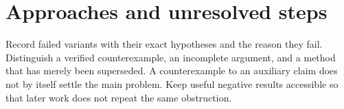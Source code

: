 \section{Approaches and unresolved steps}\label{sec:attempts}


Record failed variants with their exact hypotheses and the reason they fail.
Distinguish a verified counterexample, an incomplete argument, and a method that
has merely been superseded. A counterexample to an auxiliary claim does not by
itself settle the main problem. Keep useful negative results accessible so that
later work does not repeat the same obstruction.

